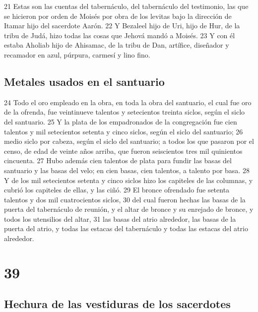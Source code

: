 21 Estas son las cuentas del tabernáculo, del tabernáculo del testimonio, las que se hicieron por orden de Moisés por obra de los levitas bajo la dirección de Itamar hijo del sacerdote Aarón.
22 Y Bezaleel hijo de Uri, hijo de Hur, de la tribu de Judá, hizo todas las cosas que Jehová mandó a Moisés.
23 Y con él estaba Aholiab hijo de Ahisamac, de la tribu de Dan, artífice, diseñador y recamador en azul, púrpura, carmesí y lino fino.

\section*{Metales usados en el santuario}

24 Todo el oro empleado en la obra, en toda la obra del santuario, el cual fue oro de la ofrenda, fue veintinueve talentos   y setecientos treinta siclos, según el siclo del santuario.
25 Y la plata de los empadronados de la congregación fue cien talentos   y mil setecientos setenta y cinco siclos, según el siclo del santuario;
26 medio siclo por cabeza, según el siclo del santuario; a todos los que pasaron por el censo, de edad de veinte años arriba, que fueron seiscientos tres mil quinientos cincuenta.
27 Hubo además cien talentos de plata   para fundir las basas del santuario y las basas del velo; en cien basas, cien talentos, a talento por basa.
28 Y de los mil setecientos setenta y cinco siclos   hizo los capiteles de las columnas, y cubrió los capiteles de ellas, y las ciñó.
29 El bronce ofrendado fue setenta talentos   y dos mil cuatrocientos siclos,
30 del cual fueron hechas las basas de la puerta del tabernáculo de reunión, y el altar de bronce y su enrejado de bronce, y todos los utensilios del altar,
31 las basas del atrio alrededor, las basas de la puerta del atrio, y todas las estacas del tabernáculo y todas las estacas del atrio alrededor.

\chapter{39}

\section*{Hechura de las vestiduras de los sacerdotes}

